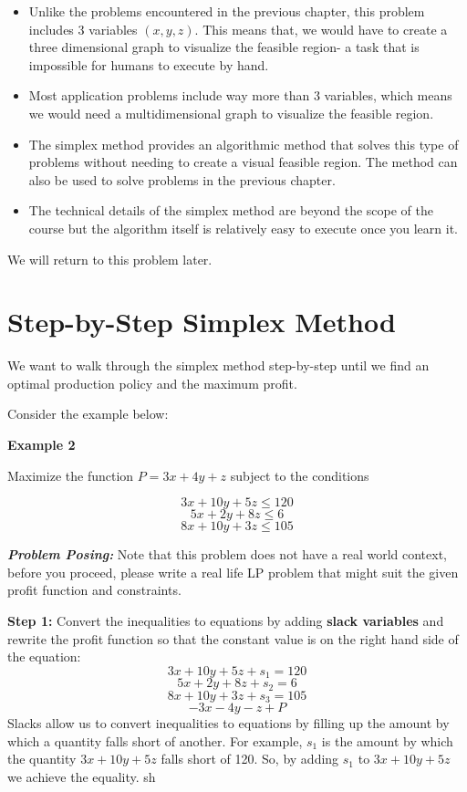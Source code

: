 \documentclass[
  letterpaper,
  DIV=11,
  numbers=noendperiod]{scrreprt}
\providecommand{\tightlist}{%
  \setlength{\itemsep}{0pt}\setlength{\parskip}{0pt}}\usepackage{longtable,booktabs,array}
\begin{document}
\begin{itemize}
\tightlist
\item
  Unlike the problems encountered in the previous chapter, this problem
  includes 3 variables \((x,y, z).\) This means that, we would have to
  create a three dimensional graph to visualize the feasible region- a
  task that is impossible for humans to execute by hand.
\item
  Most application problems include way more than 3 variables, which
  means we would need a multidimensional graph to visualize the feasible
  region.
\item
  The simplex method provides an algorithmic method that solves this
  type of problems without needing to create a visual feasible region.
  The method can also be used to solve problems in the previous chapter.
\item
  The technical details of the simplex method are beyond the scope of
  the course but the algorithm itself is relatively easy to execute once
  you learn it.
\end{itemize}

We will return to this problem later.

\hypertarget{step-by-step-simplex-method}{%
\section{Step-by-Step Simplex
Method}\label{step-by-step-simplex-method}}

We want to walk through the simplex method step-by-step until we find an
optimal production policy and the maximum profit.

Consider the example below:

\textbf{Example 2}

Maximize the function \(P=3x+4y+z\) subject to the conditions

\[3x+10y+5z \le 120 \] \[5x+2y+8z \le 6\] \[8x+10y+3z \le 105\]

\textbf{\emph{Problem Posing:}} Note that this problem does not have a
real world context, before you proceed, please write a real life LP
problem that might suit the given profit function and constraints.

\textbf{Step 1:} Convert the inequalities to equations by adding
\textbf{slack variables} and rewrite the profit function so that the
constant value is on the right hand side of the equation:
\[3x+10y+5z+s_1 = 120 \] \[5x+2y+8z +s_2= 6\] \[8x+10y+3z +s_3= 105\]
\[-3x-4y-z+P\] Slacks allow us to convert inequalities to equations by
filling up the amount by which a quantity falls short of another. For
example, \(s_1\) is the amount by which the quantity \(3x+10y+5z\) falls
short of 120. So, by adding \(s_1\) to \(3x+10y+5z\) we achieve the
equality. sh
\end{document}
